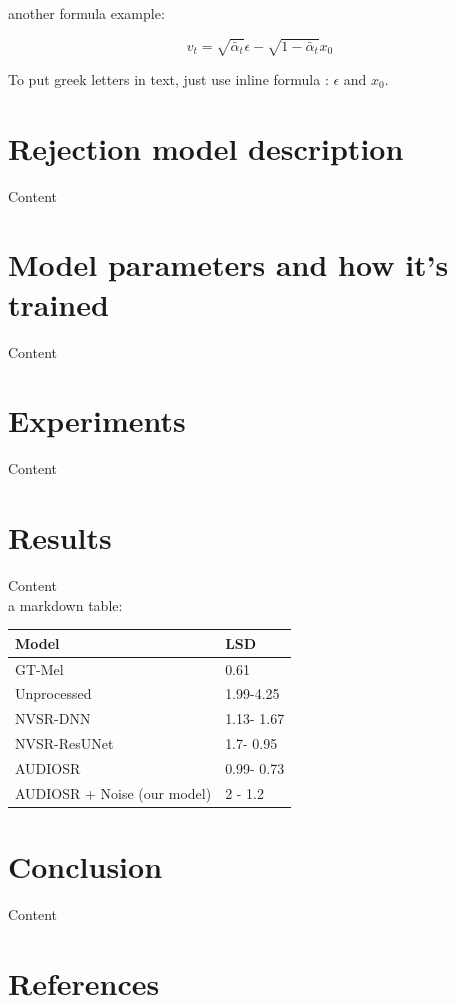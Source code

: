 \documentclass[
  ]{scrartcl}
\newlength{\cslhangindent}
\newenvironment{CSLReferences}[2] %
 {\begin{list}{}{%
  \setlength{\itemindent}{0pt}
  \setlength{\leftmargin}{0pt}
  \setlength{\parsep}{0pt}
  \ifodd #1
   \setlength{\leftmargin}{\cslhangindent}
   \setlength{\itemindent}{-1\cslhangindent}
  \fi
  \setlength{\itemsep}{#2\baselineskip}}}
 {\end{list}}
\begin{document}
another formula example:

\[v_t = \sqrt{\bar{\alpha}_t} \epsilon - \sqrt{1 - \bar{\alpha}_t} x_0\]

To put greek letters in text, just use inline formula : \(\epsilon\) and
\(x_0\).

\section{Rejection model description}\label{rejection-model-description}

Content

\section{Model parameters and how it's
trained}\label{model-parameters-and-how-its-trained}

Content

\section{Experiments}\label{experiments}

Content

\section{Results}\label{results}

Content\\
a markdown table:

\begin{longtable}[]{@{}ll@{}}
\toprule\noalign{}
Model & LSD \\
\midrule\noalign{}
\endhead
\bottomrule\noalign{}
\endlastfoot
GT-Mel & 0.61 \\
Unprocessed & 1.99-4.25 \\
NVSR-DNN & 1.13- 1.67 \\
NVSR-ResUNet & 1.7- 0.95 \\
AUDIOSR & 0.99- 0.73 \\
AUDIOSR + Noise (our model) & 2 - 1.2 \\
\end{longtable}

\section{Conclusion}\label{conclusion}

Content

\section{References}\label{references}

\label{refs}
\begin{CSLReferences}{0}{1}
\end{CSLReferences}
\end{document}
